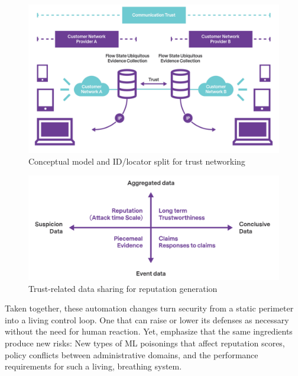 \documentclass[acmtog]{acmart}
\begin{document}
\begin{figure}[h]
  \centering
  \includegraphics[width=\linewidth]{4.3_1.png}
  \caption{Conceptual model and ID/locator split for trust networking \cite{ref5}}
\end{figure}
\begin{figure}[h]
  \centering
  \includegraphics[width=\linewidth]{4.3_2.png}
  \caption{Trust-related data sharing for reputation generation \cite{ref5}}
\end{figure}
Taken together, these automation changes turn security from a static perimeter into a living control loop. One that can raise or lower its defenses as necessary without the need for human reaction. Yet, \cite{ref5} emphasize that the same ingredients produce new risks: New types of ML poisonings that affect reputation scores, policy conflicts between administrative domains, and the performance requirements for such a living, breathing system.
\end{document}

